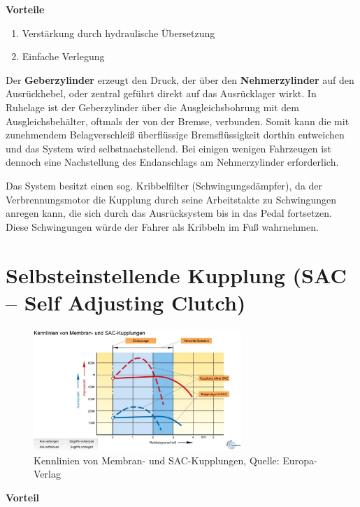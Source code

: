 \textbf{Vorteile}

\begin{enumerate}
\item
  Verstärkung durch hydraulische Übersetzung
\item
  Einfache Verlegung
\end{enumerate}

Der \textbf{Geberzylinder} erzeugt den Druck, der über den
\textbf{Nehmerzylinder} auf den Ausrückhebel, oder zentral geführt
direkt auf das Ausrücklager wirkt. In Ruhelage ist der Geberzylinder
über die Ausgleichsbohrung mit dem Ausgleichsbehälter, oftmals der von
der Bremse, verbunden. Somit kann die mit zunehmendem Belagverschleiß
überflüssige Bremsflüssigkeit dorthin entweichen und das System wird
selbstnachstellend. Bei einigen wenigen Fahrzeugen ist dennoch eine
Nachstellung des Endanschlags am Nehmerzylinder erforderlich.

Das System besitzt einen sog. Kribbelfilter (Schwingungsdämpfer), da der
Verbrennungsmotor die Kupplung durch seine Arbeitstakte zu Schwingungen
anregen kann, die sich durch das Ausrücksystem bis in das Pedal
fortsetzen. Diese Schwingungen würde der Fahrer als Kribbeln im Fuß
wahrnehmen.

\newpage

\section{Selbsteinstellende Kupplung (SAC -- Self Adjusting
Clutch)}\label{selbsteinstellende-kupplung-sac-self-adjusting-clutch}

\begin{figure}[!ht]%
\centering
\includegraphics[width=0.7\textwidth]{images/Kupplung/Kupplung-6.pdf}
\caption{Kennlinien von Membran- und SAC-Kupplungen, Quelle:
Europa-Verlag}
\end{figure}

\textbf{Vorteil}

